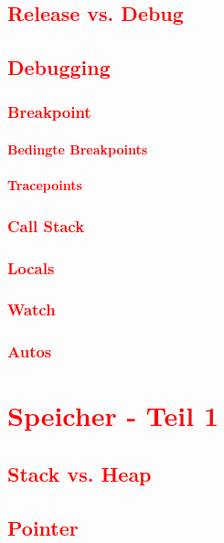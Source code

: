 \section{\textcolor{red}{Release vs. Debug}}\label{sec:release-vs-debug}
\section{\textcolor{red}{Debugging}}\label{sec:debugging}
\subsection{\textcolor{red}{Breakpoint}}\label{sec:breakpoint}
\subsubsection{\textcolor{red}{Bedingte Breakpoints}}\label{sec:conditional-breakpoint}
\subsubsection{\textcolor{red}{Tracepoints}}\label{sec:tracepoint}
\subsection{\textcolor{red}{Call Stack}}\label{sec:call-stack}
\subsection{\textcolor{red}{Locals}}\label{sec:locals}
\subsection{\textcolor{red}{Watch}}\label{sec:watch}
\subsection{\textcolor{red}{Autos}}\label{sec:autos}

\cleardoublepage\chapter{\textcolor{red}{Speicher - Teil 1}}\label{chap:memory-1}
\section{\textcolor{red}{Stack vs. Heap}}\label{sec:stack-vs-heap}
\section{\textcolor{red}{Pointer}}\label{sec:pointers}
